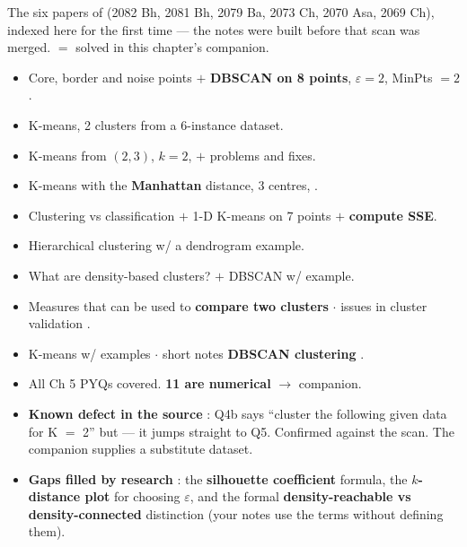 {\color{sub}\footnotesize The six papers of  (2082 Bh, 2081 Bh, 2079 Ba, 2073 Ch, 2070 Asa, 2069 Ch), indexed here for the
first time --- the notes were built before that scan was merged.  $=$ solved in this chapter's companion. \added}
\begin{itemize}
  \item {} Core, border and noise points $+$ \textbf{DBSCAN on 8 points}, $\varepsilon = 2$, MinPts $= 2$. \hfill {}  \added
  \item {} K-means, 2 clusters from a 6-instance dataset. \hfill {} 
  \item {} K-means from  $(2,3)$, $k=2$, $+$ problems and fixes. \hfill {} 
  \item {} K-means with the \textbf{Manhattan} distance, 3 centres, . \hfill {}  \added
  \item {} Clustering vs classification $+$ 1-D K-means on 7 points $+$ \textbf{compute SSE}. \hfill {}  \added
  \item Hierarchical clustering w/ a dendrogram example. \hfill {} 
  \item What are density-based clusters? $+$ DBSCAN w/ example. \hfill {} 
  \item Measures that can be used to \textbf{compare two clusters}  $\cdot$ issues in cluster validation . \hfill {}
  \item K-means w/ examples  $\cdot$ short notes \textbf{DBSCAN clustering} . \hfill {}
\end{itemize}

\begin{itemize}
  \item All Ch 5 PYQs covered. \textbf{11 are numerical} $\rightarrow$ companion.
  \item \textbf{Known defect in the source} : Q4b says ``cluster the following given data
        for K $=$ 2'' but  --- it jumps straight to Q5. Confirmed
        against the scan. The companion supplies a substitute dataset. \added
  \item \textbf{Gaps filled by research} \added: the \textbf{silhouette coefficient} formula, the
        \textbf{$k$-distance plot} for choosing $\varepsilon$, and the formal
        \textbf{density-reachable vs density-connected} distinction (your notes use the terms
        without defining them).
\end{itemize}

